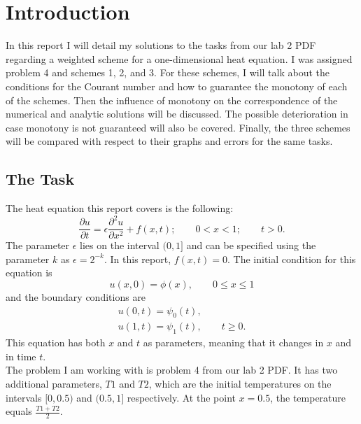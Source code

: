 \documentclass[a4paper, 12pt, reqno]{article}
\title{\titl}
\author{\auth}
\date{\today}
\begin{document}
\maketitle
\tableofcontents

\section{Introduction}

In this report I will detail my solutions to the tasks from our lab 2 PDF
regarding a weighted scheme for a one-dimensional heat equation.
I was assigned problem 4 and schemes 1, 2, and 3. For these schemes, I will
talk about the conditions for the Courant number and how to guarantee the
monotony of each of the schemes. Then the influence of monotony on the
correspondence of the numerical and analytic solutions will be discussed. The
possible deterioration in case monotony is not guaranteed will also be covered.
Finally, the three schemes will be compared with respect to their graphs and
errors for the same tasks.

\subsection{The Task}

The heat equation this report covers is the following:
\begin{equation}\nonumber
    \frac{\partial u}{\partial t} = \epsilon \frac{\partial^2 u}{\partial x^2} 
        + f(x,t); \qquad 0<x<1; \qquad t>0.
\end{equation}
The parameter $\epsilon$ lies on the interval $(0,1]$ and can be specified
using the parameter $k$ as $\epsilon = 2^{-k}$. In this report, $f(x,t) = 0$. 
The initial condition for this equation is
\begin{equation}\nonumber
    u(x,0) = \phi(x), \qquad 0 \le x \le 1
\end{equation}
and the boundary conditions are
\begin{equation}\nonumber
    \begin{gathered}
        u(0,t) = \psi_0(t),\\
        u(1,t) = \psi_1(t),\qquad t \ge 0.
    \end{gathered}
\end{equation}
This equation has both $x$ and $t$ as parameters, meaning that it changes in
$x$ and in time $t$.\\
The problem I am working with is problem 4 from our lab 2 PDF. It has two
additional parameters, $T1$ and $T2$, which are the initial temperatures on the
intervals $[0,0.5)$ and $(0.5, 1]$ respectively. At the point $x=0.5$, the
temperature equals $\frac{T1 + T2}{2}$.
\end{document}
